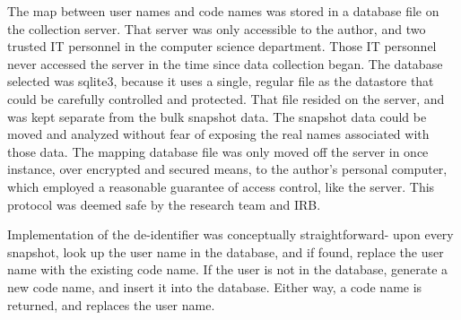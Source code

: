 The map between user names and code names was stored in a database file on the collection server. That server was only accessible to the author, and two trusted IT personnel in the computer science department. Those IT personnel never accessed the server in the time since data collection began. The database selected was sqlite3, because it uses a single, regular file as the datastore that could be carefully controlled and protected. That file resided on the server, and was kept separate from the bulk snapshot data. The snapshot data could be moved and analyzed without fear of exposing the real names associated with those data. The mapping database file was only moved off the server in once instance, over encrypted and secured means, to the author's personal computer, which employed a reasonable guarantee of access control, like the server. This protocol was deemed safe by the research team and IRB.

Implementation of the de-identifier was conceptually straightforward- upon every snapshot, look up the user name in the database, and if found, replace the user name with the existing code name. If the user is not in the database, generate a new code name, and insert it into the database. Either way, a code name is returned, and replaces the user name. 



